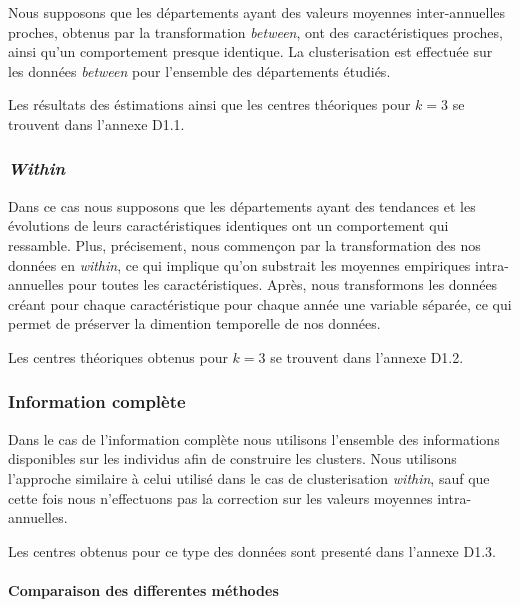 \documentclass[11pt,]{article}
\let\oldparagraph\paragraph
\renewcommand{\paragraph}[1]{\oldparagraph{#1}\mbox{}}
\begin{document}
Nous supposons que les départements ayant des valeurs moyennes
inter-annuelles proches, obtenus par la transformation \emph{between},
ont des caractéristiques proches, ainsi qu'un comportement presque
identique. La clusterisation est effectuée sur les données
\emph{between} pour l'ensemble des départements étudiés.

Les résultats des éstimations ainsi que les centres théoriques pour
\(k = 3\) se trouvent dans l'annexe D1.1.

\hypertarget{within}{%
\subsubsection{\texorpdfstring{\emph{Within}}{Within}}\label{within}}

Dans ce cas nous supposons que les départements ayant des tendances et
les évolutions de leurs caractéristiques identiques ont un comportement
qui ressamble. Plus, précisement, nous commençon par la transformation
des nos données en \emph{within}, ce qui implique qu'on substrait les
moyennes empiriques intra-annuelles pour toutes les caractéristiques.
Après, nous transformons les données créant pour chaque caractéristique
pour chaque année une variable séparée, ce qui permet de préserver la
dimention temporelle de nos données.

Les centres théoriques obtenus pour \(k = 3\) se trouvent dans l'annexe
D1.2.

\hypertarget{information-complete}{%
\subsubsection{Information complète}\label{information-complete}}

Dans le cas de l'information complète nous utilisons l'ensemble des
informations disponibles sur les individus afin de construire les
clusters. Nous utilisons l'approche similaire à celui utilisé dans le
cas de clusterisation \emph{within}, sauf que cette fois nous
n'effectuons pas la correction sur les valeurs moyennes intra-annuelles.

Les centres obtenus pour ce type des données sont presenté dans l'annexe
D1.3.

\hypertarget{comparaison-des-differentes-methodes}{%
\paragraph{Comparaison des differentes
méthodes}\label{comparaison-des-differentes-methodes}}
\end{document}
